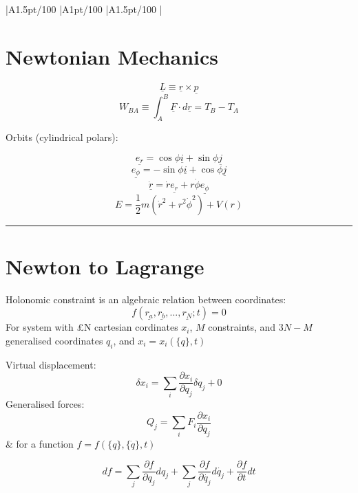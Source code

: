 \documentclass[table,cmyk]{article}
\makeatletter
\newcommand\ratio[2]{\strip@pt\dimexpr#1pt/#2\relax}
\makeatother
\begin{document}
\begin{longtable}
{
    |A{1.5}{\ratio{30}{100}}%
    |A{1}{\ratio{30}{100}}%
    |A{1.5}{\ratio{30}{100}}%
    |%
}\hline
\section*{Newtonian Mechanics}
\[ \underline{L} \equiv \underline{r} \times \underline{p}\]
\[ W_{BA} \equiv \int_{A}^{B} \underline{F}\cdot d\underline{r} = T_B - T_A\]

Orbits (cylindrical polars):

\[\underline{e_r} = \cos\phi\underline{i} + \sin\phi\underline{j}
\]\[
\underline{e_{\phi}} = -\sin\phi\underline{i} + \cos\phi\underline{j}\]
\[\underline{\dot{r}} = \dot{r} \underline{e_r} + r \dot{\phi} \underline{e_{\phi}}\]
\[E = \frac{1}{2}m(\dot{r}^2 + r^2\dot{\phi}^2) +V(r)\]

\noindent\rule{7.8cm}{0.4pt}

\section*{Newton to Lagrange}
Holonomic constraint is an algebraic relation between coordinates:
\[f(\underline{r_a},\underline{r_b},...,\underline{r_N};t) = 0\]
For system with £N cartesian cordinates $x_i$, $M$ constraints, and $3N-M$ generalised coordinates $q_i$, and $x_i = x_i(\{q\},t)$
\newline

Virtual displacement:
\[\delta x_i = \sum_{i} \frac{\partial x_i}{\partial q_j} \delta q_j + 0\]
Generalised forces:
\[Q_j = \sum_{i} F_i \frac{\partial x_i}{\partial q_j}\]
&
for a function $f = f(\{q\},\{\dot{q}\},t)$

\[df = \sum_{j} \frac{\partial f}{\partial q_j}dq_j + \sum_{j} \frac {\partial f}{\partial \dot{q_j}} d\dot{q_j} + \frac{\partial f}{\partial t}dt\]


\end{longtable}
\end{document}
